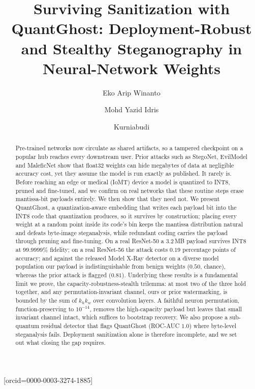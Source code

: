 \documentclass[a4paper,fleqn]{cas-dc}
\theoremstyle{plain}
\theoremstyle{remark}
\newcommand{\sys}{\mbox{QuantGhost}}
\begin{document}

\title[mode=title]{Surviving Sanitization with \sys: Deployment-Robust and Stealthy Steganography in Neural-Network Weights}

\author[1,2]{Eko Arip Winanto}[orcid=0000-0003-3274-1885]
\author[1,3]{Mohd Yazid Idris}
\author[4]{Kurniabudi}
\cormark[1]


\begin{abstract}
Pre-trained networks now circulate as shared artifacts, so a tampered checkpoint on a
popular hub reaches every downstream user. Prior attacks such as StegoNet, EvilModel
and MaleficNet show that float32 weights can hide megabytes of data at negligible
accuracy cost, yet they assume the model is run exactly as published. It rarely is.
Before reaching an edge or medical (IoMT) device a model is quantized to INT8, pruned
and fine-tuned, and we confirm on real networks that these routine steps erase
mantissa-bit payloads entirely. We then show that they need not. We present \sys, a
quantization-aware embedding that writes each payload bit into the INT8 code that
quantization produces, so it survives by construction; placing every weight at a random point inside its code's bin
keeps the mantissa distribution natural and defeats byte-image steganalysis, while
redundant coding carries the payload through pruning and fine-tuning. On a real
ResNet-50 a $3.2$\,MB payload survives INT8 at $99.9999\%$ fidelity; on a real
ResNet-56 the attack costs $0.19$ percentage points of accuracy; and against the
released Model X-Ray detector on a diverse model population our payload is
indistinguishable from benign weights ($0.50$, chance), whereas the prior attack is
flagged ($0.81$). Underlying these results is a fundamental limit we prove, the
capacity-robustness-stealth trilemma: at most two of the three hold together, and any
permutation-invariant channel, ours or prior watermarking, is bounded by the sum of
$k_h k_w$ over convolution layers. A faithful neuron permutation, function-preserving
to $10^{-14}$, removes the high-capacity payload but leaves that small invariant
channel intact, which suffices to bootstrap recovery. We also propose a sub-quantum
residual detector that flags QuantGhost (ROC-AUC $1.0$) where byte-level steganalysis
fails. Deployment sanitization alone is therefore incomplete, and we set out what closing
the gap requires.
\end{abstract}
\end{document}
